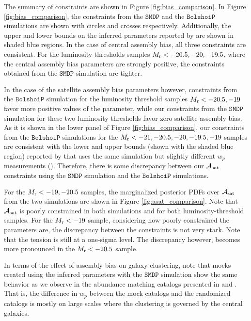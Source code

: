 \documentclass[12pt, preprint]{aastex}
\newcommand{\asat}{\mathcal{A}_{\rm sat}}
\begin{document}
The summary of constraints are shown in Figure \ref{fig:bias_comparison}. In Figure \ref{fig:bias_comparison}, the constraints from the $\mathtt{SMDP}$ and the $\mathtt{BolshoiP}$ simulations are shown with circles and crosses respectively. Additionally, the upper and lower bounds on the inferred parameters reported by \citet{zentner2016} are shown in shaded blue regions. In the case of central assembly bias, all three constraints are consistent. For the luminosity-thresholds samples $M_{\rm r}<-20.5, -20, -19.5$, where the central assembly bias parameters are strongly positive, the constraints obtained from the $\mathtt{SMDP}$ simulation are tighter. 
  
In the case of the satellite assembly bias parameters however, constraints from the $\mathtt{BolshoiP}$ simulation for the luminosity threshold samples $M_{\rm r}<-20.5, -19$ favor more positive values of the parameter, while our constraints from the $\mathtt{SMDP}$ simulation for these two luminosity thresholds favor zero satellite assembly bias. As it is shown in the lower panel of Figure \ref{fig:bias_comparison}, our constraints from the $\mathtt{BolshoiP}$ simulations for the $M_{\rm r}<-21, -20.5, -20, -19.5, -19$ samples are consistent with the lower and upper bounds (shown with the shaded blue region) reported by \citet{zentner2016} that uses the same simulation but slightly different $w_{p}$ measurements (\citealt{zehavi2011}). Therefore, there is some discrepancy between our $\asat$ constraints using the $\mathtt{SMDP}$ simulation and the $\mathtt{BolshoiP}$ simulations. 

For the $M_{\rm r}<-19, -20.5$ samples, the marginalized posterior PDFs over $\asat$ from the two simulations are shown in Figure \ref{fig:asat_comparison}. Note that $\asat$ is poorly constrained in both simulations and for both luminosity-threshold samples. For the $M_{\rm r}<-19$ sample, considering how poorly constrained the parameters are, the discrepancy between the constraints is not very stark. Note that the tension is still at a one-sigma level. The discrepancy however, becomes more pronounced in the $M_{\rm r}<-20.5$ sample. 

In terms of the effect of assembly bias on galaxy clustering, note that mocks created using the inferred parameters with the $\mathtt{SMDP}$ simulation show the same behavior as we observe in the abundance matching catalogs presented in \citet{arz2014} and \citet{lehman2015}. That is, the difference in $w_{p}$ between the mock catalogs and the randomized catalogs is mostly on large scales where the clustering is governed by the central galaxies. 
\end{document}
